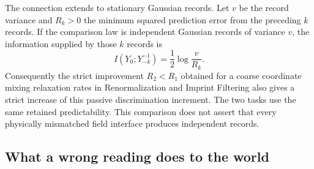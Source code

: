 \documentclass[11pt,a4paper]{article}
\begin{document}
The connection extends to stationary Gaussian records. Let $v$ be the
record variance and $R_k>0$ the minimum squared prediction error from the
preceding $k$ records. If the comparison law is independent Gaussian
records of variance $v$, the information supplied by those $k$ records is
\[
 I(Y_0;Y_{-k}^{-1})=\frac12\log\frac{v}{R_k}.
\]
Consequently the strict improvement $R_2<R_1$ obtained for a coarse
coordinate mixing relaxation rates in Renormalization and Imprint
Filtering \cite{ImprintRG} also gives a strict increase of this passive
discrimination increment. The two tasks use the same retained
predictability. This comparison does not assert that every physically
mismatched field interface produces independent records.

\subsection{What a wrong reading does to the world}\label{subsec:disturb}
\end{document}
